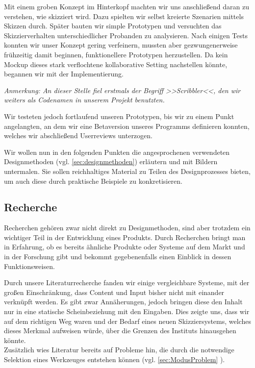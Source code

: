 Mit einem groben Konzept im Hinterkopf machten wir uns anschließend daran zu verstehen, wie skizziert wird. Dazu spielten wir selbst kreierte Szenarien mittels Skizzen durch. Später bauten wir simple Prototypen und versuchten das Skizzierverhalten unterschiedlicher Probanden zu analysieren. Nach einigen Tests konnten wir unser Konzept gering verfeinern, mussten aber gezwungenerweise frühzeitig damit beginnen, funktionellere Prototypen herzustellen. Da kein Mockup dieses stark verflochtene kollaborative Setting nachstellen könnte, begannen wir mit der Implementierung.

\bigskip \emph{Anmerkung: \graffito{\(\clubsuit\)} An dieser Stelle fiel erstmals der Begriff >>Scribbler<<, den wir weiters als Codenamen in unserem Projekt benutzten.}
\bigskip

Wir testeten jedoch fortlaufend unseren Prototypen, bis wir zu einem Punkt angelangten, an dem wir eine Betaversion unseres Programms definieren konnten, welches wir abschließend Userreviews unterzogen.

\medskip Wir wollen nun in den folgenden Punkten die angesprochenen verwendeten Designmethoden (vgl. \autoref{sec:designmethoden}) erläutern und mit Bildern untermalen. Sie sollen reichhaltiges Material zu Teilen des Designprozesses bieten, um auch diese durch praktische Beispiele zu konkretisieren.

\subsection{Recherche}
Recherchen gehören zwar nicht direkt zu Designmethoden, sind aber trotzdem ein wichtiger Teil in der Entwicklung eines Produkts. Durch Recherchen bringt man in Erfahrung, ob es bereits ähnliche Produkte oder Systeme auf dem Markt und in der Forschung gibt und bekommt gegebenenfalls einen Einblick in dessen Funktionsweisen.

\medskip Durch unsere Literaturrecherche fanden wir einige vergleichbare Systeme, mit der großen Einschränkung, dass Content und Input bisher nicht mit einander verknüpft werden. Es gibt zwar Annäherungen, jedoch bringen diese den Inhalt nur in eine statische Scheinbeziehung mit den Eingaben. Dies zeigte uns, dass wir auf dem richtigen Weg waren und der Bedarf eines neuen Skizziersystems, welches dieses Merkmal aufweisen würde, über die Grenzen des Instituts hinausgehen könnte. \\
Zusätzlich wies Literatur bereits auf Probleme hin, die durch die notwendige Selektion eines Werkzeuges entstehen können (vgl. \ref{sec:ModusProblem} ).


